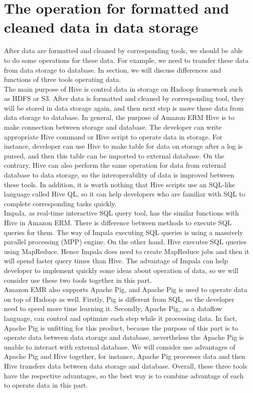         \section{The operation for formatted and cleaned data in data storage}
        After data are formatted and cleaned by corresponding tools, we should be able to do some operations for these data. For example, we need to transfer these data from data storage to database. In section, we will discuss differences and functions of three tools operating data.\\

        \noindent The main purpose of Hive is control data in storage on Hadoop framework such as HDFS or S3. After data is formatted and cleaned by corresponding tool, they will be stored in data storage again, and then next step is move these data from data storage to database. In general, the purpose of Amazon ERM Hive is to make connection between storage and database. The developer can write appropriate Hive command or Hive script to operate data in storage. For instance, developer can use Hive to make table for data on storage after a log is pursed, and then this table can be imported to external database. On the contrary, Hive can also perform the same operation for data from external database to data storage, so the interoperability of data is improved between these tools. In addition, it is worth nothing that Hive scripts use an SQL-like language called Hive QL\cite{Z7}, so it can help developers who are familiar with SQL to complete corresponding tasks quickly.\\

        \noindent Impala, as real-time interactive SQL query tool, has the similar functions with Hive in Amazon ERM. There is difference between methods to execute SQL queries for them. The way of Impala executing SQL queries is using a massively parallel processing (MPP) engine. On the other hand, Hive executes SQL queries using MapReduce. Hence Impala does need to create MapReduce jobs and then it will spend faster query times than Hive\cite{Z8}. The advantage of Impala can help developer to implement quickly some ideas about operation of data, so we will consider use these two tools together in this part.\\
        
        \noindent Amazon EMR also supports Apache Pig, and Apache Pig is used to operate data on top of Hadoop as well. Firstly, Pig is different from SQL, so the developer need to speed more time learning it. Secondly, Apache Pig, as a dataflow language, can control and optimize each step while it processing data. In fact, Apache Pig is unfitting for this product, because the purpose of this part is to operate data between data storage and database, nevertheless the Apache Pig is unable to interact with external database. We will consider use advantages of Apache Pig and Hive together, for instance, Apache Pig processes data and then Hive transfers data between data storage and database. Overall, these three tools have the respective advantages, so the best way is to combine advantage of each to operate data in this part.
